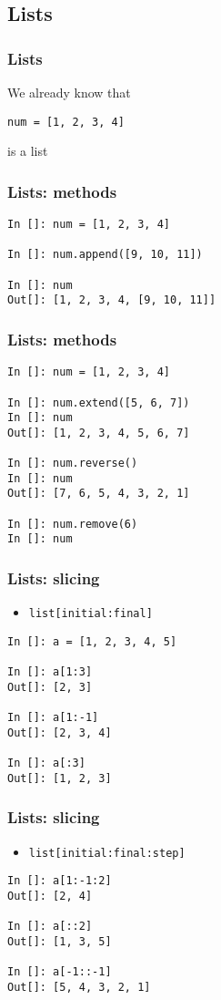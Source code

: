 \documentclass[14pt,compress]{beamer}
\newcommand{\typ}[1]{\texttt{#1}}
\begin{document}
\subsection{Lists}
\begin{frame}[fragile]
  \frametitle{Lists}
\begin{block}{We already know that}
  \begin{lstlisting}
num = [1, 2, 3, 4]
  \end{lstlisting}
\centerline{is a list}
\end{block}
\end{frame}

\begin{frame}[fragile]
  \frametitle{Lists: methods}
  \begin{lstlisting}
In []: num = [1, 2, 3, 4]

In []: num.append([9, 10, 11])

In []: num
Out[]: [1, 2, 3, 4, [9, 10, 11]]
  \end{lstlisting}
\end{frame}

\begin{frame}[fragile]
  \frametitle{Lists: methods}
  \begin{lstlisting}
In []: num = [1, 2, 3, 4]

In []: num.extend([5, 6, 7])
In []: num
Out[]: [1, 2, 3, 4, 5, 6, 7]

In []: num.reverse()
In []: num
Out[]: [7, 6, 5, 4, 3, 2, 1]

In []: num.remove(6)
In []: num
  \end{lstlisting}
\end{frame}

\begin{frame}[fragile]
  \frametitle{Lists: slicing}
  \begin{itemize}
    \item \typ{list[initial:final]}
  \end{itemize}
\begin{lstlisting}
In []: a = [1, 2, 3, 4, 5]

In []: a[1:3]
Out[]: [2, 3]

In []: a[1:-1]
Out[]: [2, 3, 4]

In []: a[:3]
Out[]: [1, 2, 3]
\end{lstlisting}
\end{frame}

\begin{frame}[fragile]
  \frametitle{Lists: slicing}
  \begin{itemize}
    \item \typ{list[initial:final:step]}
  \end{itemize}
\begin{lstlisting}
In []: a[1:-1:2]
Out[]: [2, 4]

In []: a[::2]
Out[]: [1, 3, 5]

In []: a[-1::-1]
Out[]: [5, 4, 3, 2, 1]
\end{lstlisting}
\end{frame}
\end{document}
